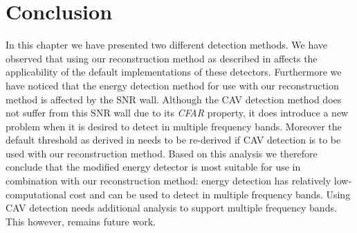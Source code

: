 \documentclass[a4paper, openany, oneside]{memoir}
\begin{document}
\section{Conclusion}
In this chapter we have presented two different detection methods. We have observed that using our reconstruction method as described in  affects the applicability of the default implementations of these detectors.  Furthermore we have noticed that the energy detection method for use with our reconstruction method is affected by the SNR wall. Although the CAV detection method does not suffer from this SNR wall due to its \emph{CFAR} property, it does introduce a new problem when it is desired to detect in multiple frequency bands. Moreover the default threshold as derived in \cite{zheng2009spectrum} needs to be re-derived if CAV detection is to be used with our reconstruction method. Based on this analysis we therefore conclude that the modified energy detector is most suitable for use in combination with our reconstruction method: energy detection has relatively low-computational cost and can be used to detect in multiple frequency bands.  Using CAV detection needs additional analysis to support multiple frequency bands. This however, remains future work.
\end{document}
